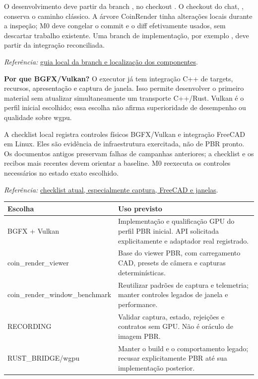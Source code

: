 \documentclass[11pt,a4paper]{article}
\newcommand{\src}[2]{\par{\small\textit{Referência:} \href{#1}{#2}.}\par}
\begin{document}
O desenvolvimento deve partir da branch , no checkout . O checkout do chat, , conserva o caminho clássico. A árvore CoinRender tinha alterações locais durante a inspeção; M0 deve congelar o commit e o diff efetivamente usados, sem descartar trabalho existente. Uma branch de implementação, por exemplo , deve partir da integração reconciliada.
\src{/mnt/Laranja/Git/externos/coin-render/docs/coin-render-branch-guide.md}{guia local da branch e localização dos componentes}

\textbf{Por que BGFX/Vulkan?} O executor já tem integração C++ de targets, recursos, apresentação e captura de janela. Isso permite desenvolver o primeiro material sem atualizar simultaneamente um transporte C++/Rust. Vulkan é o perfil inicial escolhido; essa escolha não afirma superioridade de desempenho ou qualidade sobre wgpu.

A checklist local registra controles físicos BGFX/Vulkan e integração FreeCAD em Linux. Eles são evidência de infraestrutura exercitada, não de PBR pronto. Os documentos antigos preservam falhas de campanhas anteriores; a checklist e os recibos mais recentes devem orientar a baseline. M0 reexecuta os controles necessários no estado exato escolhido.
\src{/mnt/Laranja/Git/externos/coin-render/docs/coin-render-next-fronts-checklist.md}{checklist atual, especialmente captura, FreeCAD e janelas}

\begin{center}\small
\begin{tabular}{P{.25\linewidth}P{.65\linewidth}}
\toprule Escolha & Uso previsto\\\midrule
BGFX + Vulkan & Implementação e qualificação GPU do perfil PBR inicial. API solicitada explicitamente e adaptador real registrado.\\
coin\_render\_viewer & Base do viewer PBR, com carregamento CAD, presets de câmera e capturas determinísticas.\\
coin\_render\_window\_\allowbreak benchmark & Reutilizar padrões de captura e telemetria; manter controles legados de janela e performance.\\
RECORDING & Validar captura, estado, rejeições e contratos sem GPU. Não é oráculo de imagem PBR.\\
RUST\_BRIDGE/wgpu & Manter o build e o comportamento legado; recusar explicitamente PBR até sua implementação posterior.\\\bottomrule
\end{tabular}\end{center}
\end{document}
